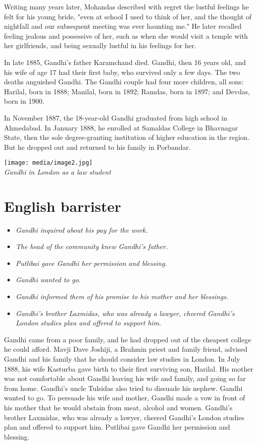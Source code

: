 Writing many years later, Mohandas described with regret the lustful
feelings he felt for his young bride, "even at school I used to think of
her, and the thought of nightfall and our subsequent meeting was ever
haunting me." He later recalled feeling jealous and possessive of her,
such as when she would visit a temple with her girlfriends, and being
sexually lustful in his feelings for her.

In late 1885, Gandhi's father Karamchand died. Gandhi, then 16 years
old, and his wife of age 17 had their first baby, who survived only a
few days. The two deaths anguished Gandhi. The Gandhi couple had four
more children, all sons: Harilal, born in 1888; Manilal, born in 1892;
Ramdas, born in 1897; and Devdas, born in 1900.

In November 1887, the 18-year-old Gandhi graduated from high school in
Ahmedabad. In January 1888, he enrolled at Samaldas College in Bhavnagar
State, then the sole degree-granting institution of higher education in
the region. But he dropped out and returned to his family in Porbandar.

\texttt{[image: media/image2.jpg]}\\
\emph{Gandhi in London as a law student}

\section{English barrister}\label{english-barrister}

\begin{itemize}
\item
  \emph{Gandhi inquired about his pay for the work.}
\item
  \emph{The head of the community knew Gandhi's father.}
\item
  \emph{Putlibai gave Gandhi her permission and blessing.}
\item
  \emph{Gandhi wanted to go.}
\item
  \emph{Gandhi informed them of his promise to his mother and her
  blessings.}
\item
  \emph{Gandhi's brother Laxmidas, who was already a lawyer, cheered
  Gandhi's London studies plan and offered to support him.}
\end{itemize}

Gandhi came from a poor family, and he had dropped out of the cheapest
college he could afford. Mavji Dave Joshiji, a Brahmin priest and family
friend, advised Gandhi and his family that he should consider law
studies in London. In July 1888, his wife Kasturba gave birth to their
first surviving son, Harilal. His mother was not comfortable about
Gandhi leaving his wife and family, and going so far from home. Gandhi's
uncle Tulsidas also tried to dissuade his nephew. Gandhi wanted to go.
To persuade his wife and mother, Gandhi made a vow in front of his
mother that he would abstain from meat, alcohol and women. Gandhi's
brother Laxmidas, who was already a lawyer, cheered Gandhi's London
studies plan and offered to support him. Putlibai gave Gandhi her
permission and blessing.

